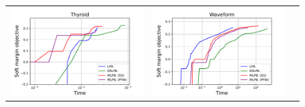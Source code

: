 \begin{figure}[p]
\begin{tabular}{ccc}
\begin{minipage}[t]{0.31\hsize}
            \includegraphics[keepaspectratio, scale=0.30]
            {figure/curve_logtime_thyroid.pdf}
        \end{minipage}
        &
        \begin{minipage}[t]{0.31\hsize}
            \centering
            \includegraphics[keepaspectratio, scale=0.30]
            {figure/curve_logtime_waveform.pdf}
        \end{minipage}
        &
        \begin{minipage}[t]{0.31\hsize}
            \centering
            \includegraphics[keepaspectratio, scale=0.30]

\end{minipage}
\end{tabular}
\end{figure}
